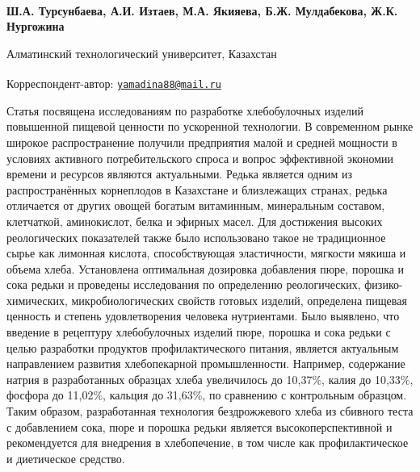 
\begin{articleheader}

{\bfseries
Ш.А. Турсунбаева,
А.И. Изтаев,
М.А. Якияева\textsuperscript{\envelope },
Б.Ж. Мулдабекова,
Ж.К. Нургожина
}
\end{articleheader}

\begin{affiliation}
Алматинский технологический университет, Казахстан

\raggedright \textsuperscript{\envelope }Корреспондент-автор:
\href{mailto:yamadina88@mail.ru}{\nolinkurl{yamadina88@mail.ru}}
\end{affiliation}

Статья посвящена исследованиям по разработке хлебобулочных изделий
повышенной пищевой ценности по ускоренной технологии. В современном
рынке широкое распространение получили предприятия малой и средней
мощности в условиях активного потребительского спроса и вопрос
эффективной экономии времени и ресурсов являются актуальными. Редька
является одним из распространённых корнеплодов в Казахстане и
близлежащих странах, редька отличается от других овощей богатым
витаминным, минеральным составом, клетчаткой, аминокислот, белка и
эфирных масел. Для достижения высоких реологических показателей также
было использовано такое не традиционное сырье как лимонная кислота,
способствующая эластичности, мягкости мякиша и объема хлеба. Установлена
оптимальная дозировка добавления пюре, порошка и сока редьки и проведены
исследования по определению реологических, физико-химических,
микробиологических свойств готовых изделий, определена пищевая ценность
и степень удовлетворения человека нутриентами. Было выявлено, что
введение в рецептуру хлебобулочных изделий пюре, порошка и сока редьки с
целью разработки продуктов профилактического питания, является
актуальным направлением развития хлебопекарной промышленности. Например,
содержание натрия в разработанных образцах хлеба увеличилось до 10,37\%,
калия до 10,33\%, фосфора до 11,02\%, кальция до 31,63\%, по сравнению с
контрольным образцом. Таким образом, разработанная технология
бездрожжевого хлеба из сбивного теста с добавлением сока, пюре и порошка
редьки является высокоперспективной и рекомендуется для внедрения в
хлебопечение, в том числе как профилактическое и диетическое средство.

